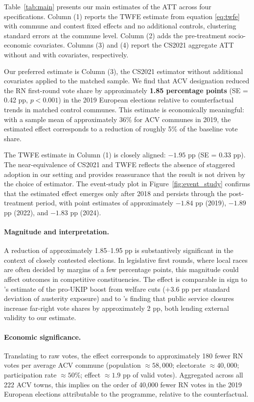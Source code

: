 Table~\ref{tab:main} presents our main estimates of the ATT across four specifications. Column (1) reports the TWFE estimate from equation \eqref{eq:twfe} with commune and contest fixed effects and no additional controls, clustering standard errors at the commune level. Column (2) adds the pre-treatment socio-economic covariates. Columns (3) and (4) report the CS2021 aggregate ATT without and with covariates, respectively.

\bigskip

\bigskip

Our preferred estimate is Column (3), the CS2021 estimator without additional covariates applied to the matched sample. We find that ACV designation reduced the RN first-round vote share by approximately \textbf{1.85 percentage points} (SE = 0.42 pp, $p < 0.001$) in the 2019 European elections relative to counterfactual trends in matched control communes. This estimate is economically meaningful: with a sample mean of approximately 36\% for ACV communes in 2019, the estimated effect corresponds to a reduction of roughly 5\% of the baseline vote share.

The TWFE estimate in Column (1) is closely aligned: $-1.95$ pp (SE = $0.33$ pp). The near-equivalence of CS2021 and TWFE reflects the absence of staggered adoption in our setting and provides reassurance that the result is not driven by the choice of estimator. The event-study plot in Figure~\ref{fig:event_study} confirms that the estimated effect emerges only after 2018 and persists through the post-treatment period, with point estimates of approximately $-1.84$ pp (2019), $-1.89$ pp (2022), and $-1.83$ pp (2024).

\paragraph{Magnitude and interpretation.} A reduction of approximately 1.85--1.95 pp is substantively significant in the context of closely contested elections. In legislative first rounds, where local races are often decided by margins of a few percentage points, this magnitude could affect outcomes in competitive constituencies. The effect is comparable in sign to \citet{Fetzer2019}'s estimate of the pro-UKIP boost from welfare cuts ($+3.6$ pp per standard deviation of austerity exposure) and to \citet{Cremaschi2025}'s finding that public service closures increase far-right vote shares by approximately 2 pp, both lending external validity to our estimate.

\paragraph{Economic significance.} Translating to raw votes, the effect corresponds to approximately 180 fewer RN votes per average ACV commune (population $\approx 58{,}000$; electorate $\approx 40{,}000$; participation rate $\approx 50\%$; effect $\approx 1.9$ pp of valid votes). Aggregated across all 222 ACV towns, this implies on the order of 40{,}000 fewer RN votes in the 2019 European elections attributable to the programme, relative to the counterfactual.

